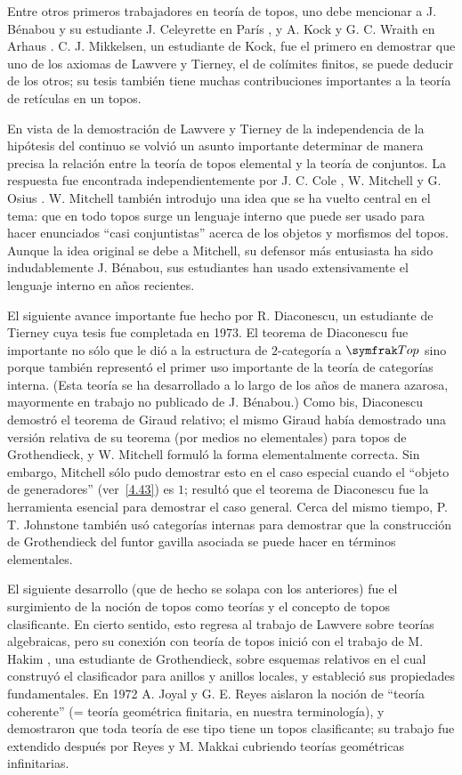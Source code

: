 Entre otros primeros trabajadores en teoría de topos, uno debe mencionar a J.
Bénabou y su estudiante J. Celeyrette en París \pend{[BC]}, y A. Kock y G. C.
Wraith en Arhaus \pend{[KW]}. C. J. Mikkelsen, un estudiante de Kock, fue el
primero en demostrar que uno de los axiomas de Lawvere y Tierney, el de
colímites finitos, se puede deducir de los otros; su tesis \pend{[84]} también
tiene muchas contribuciones importantes a la teoría de retículas en un topos.

En vista de la demostración de Lawvere y Tierney de la independencia de la
hipótesis del continuo \pend{[117]} se volvió un asunto importante determinar de
manera precisa la relación entre la teoría de topos elemental y la teoría de
conjuntos. La respuesta fue encontrada independientemente por J. C. Cole
\pend{[18]}, W. Mitchell \pend{[85]} y G. Osius \pend{[92]}. W. Mitchell también
introdujo una idea que se ha vuelto central en el tema: que en todo topos surge
un lenguaje interno que puede ser usado para hacer enunciados \enquote{casi
conjuntistas} acerca de los objetos y morfismos del topos. Aunque la idea
original se debe a Mitchell, su defensor más entusiasta ha sido indudablemente
J. Bénabou, sus estudiantes han usado extensivamente el lenguaje interno en años
recientes.

El siguiente avance importante fue hecho por R. Diaconescu, un estudiante de
Tierney cuya tesis fue completada en 1973. El teorema de Diaconescu \pend{[30]}
fue importante no sólo que le dió a la estructura de \(2\)-categoría a \(\cattop\)
sino porque también representó el primer uso importante de la teoría de
categorías interna. (Esta teoría se ha desarrollado a lo largo de los años de
manera azarosa, mayormente en trabajo no publicado de J. Bénabou.) Como bis,
Diaconescu demostró el teorema de Giraud relativo; el mismo Giraud \pend{[39]}
había demostrado una versión relativa de su teorema (por medios no elementales)
para topos de Grothendieck, y W. Mitchell formuló la forma elementalmente
correcta. Sin embargo, Mitchell sólo pudo demostrar esto en el caso especial
cuando el \enquote{objeto de generadores} (ver~\ref{4.43}) es \(1\); resultó que
el teorema de Diaconescu fue la herramienta esencial para demostrar el caso
general. Cerca del mismo tiempo, P. T. Johnstone \pend{[52]} también usó
categorías internas para demostrar que la construcción de Grothendieck del
funtor gavilla asociada se puede hacer en términos elementales.

El siguiente desarrollo (que de hecho se solapa con los anteriores) fue el
surgimiento de la noción de topos como teorías y el concepto de topos
clasificante. En cierto sentido, esto regresa al trabajo de Lawvere \pend{[176]}
sobre teorías algebraicas, pero su conexión con teoría de topos inició con el
trabajo de M. Hakim \pend{[45]}, una estudiante de Grothendieck, sobre esquemas
relativos  en el cual construyó el clasificador para anillos y anillos locales,
y estableció sus propiedades fundamentales. En 1972 A. Joyal y G. E. Reyes
\pend{[RM]} aislaron la noción de \enquote{teoría coherente} (= teoría
geométrica finitaria, en nuestra terminología), y demostraron que toda teoría de
ese tipo tiene un topos clasificante; su trabajo fue extendido después por Reyes
y M. Makkai \pend{[82]} cubriendo teorías geométricas infinitarias.

